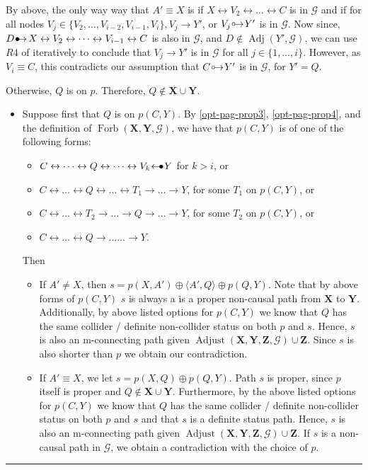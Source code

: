 \documentclass[twoside]{article}
\DeclareMathOperator{\Adj}{Adj}
\DeclareMathOperator{\Forb}{Forb}
\newcommand{\fb}[2][X,Y]{\Forb(\mb{#1},#2)}
\DeclareMathOperator{\Adjust}{Adjust}
\newcommand{\adjustb}[2][X,Y,Z]{\Adjust(\mb{#1},#2)}
\newcommand{\mb}[1]{\mathbf{#1}}
\newcommand{\g}[1][G]{\mathcal{#1}}
\newenvironment{proofof}[1][]{\begin{trivlist}
\item[\hskip \labelsep {\bfseries Proof of #1.}]}{\hfill\BlackBox\end{trivlist}}
\newcommand{\BlackBox}{\rule{1.5ex}{1.5ex}}
\newcommand{\bulletarrow}{
  \setlength{\unitlength}{1mm}
  \begin{picture}(5,1)(0,0)
    \put(0.2,0){$\bullet$}
    \put(1,0){$\rightarrow$}
  \end{picture}
}
\newcommand{\arrowbullet}{
  \setlength{\unitlength}{1mm}
  \begin{picture}(5,1)(0,0)
    \put(0.2,0){$\leftarrow$}
    \put(3,0){$\bullet$}
  \end{picture}
}
\newcommand{\circarrow}{
  \setlength{\unitlength}{1mm}
  \begin{picture}(5,1)(0,0)
    \put(1,1){\circle{1}}
    \put(1.2,0){$\rightarrow$}
  \end{picture}
}
\begin{document}
\begin{proofof}[Lemma \ref{lem:adjust-and-o-pag-helper}]
\begin{itemize}
\begin{itemize}
        By above, the only way way that $A' \equiv X$ is if $X \leftrightarrow V_2 \leftrightarrow \dots \leftrightarrow C$ is in $\g$ and if for all nodes $V_j\in \{V_2, \dots, V_{i-2}, V_{i-1}, V_i\}, V_j \to Y'$, or $V_j \circarrow Y'$ is in $\g$. Now since, $D \bulletarrow X \leftrightarrow V_2 \leftrightarrow \dots \leftrightarrow V_{i-1}  \leftrightarrow C$ is also in $\g$, and $D \notin \Adj(Y', \g)$, we can use $R4$ of \cite{zhang2008completeness} iteratively to conclude that $V_j \to Y'$ is in $\g$ for all $j \in \{1,\dots, i\}$. However, as $V_i \equiv C$, this contradicts our assumption that $C \circarrow Y'$ is in $\g$, for $Y' = Q$.
            
        \end{itemize} 
    \end{itemize}

    Otherwise, $Q$ is on $p$. Therefore, $Q \notin \mb{X} \cup \mb{Y}$. 
    \begin{itemize}
        \item Suppose first that $Q$ is on $p(C,Y)$. By \ref{opt-pag-prop3}, \ref{opt-pag-prop4}, and the definition of $\fb{\g}$, we have that $p(C, Y)$ is of one of the following forms:
        \begin{itemize}
            \item $C \leftrightarrow \dots \leftrightarrow Q \leftrightarrow \dots \leftrightarrow V_k \arrowbullet Y$ for $k > i$, or
            \item $C \leftrightarrow \dots \leftrightarrow Q \leftrightarrow \dots \leftrightarrow T_1 \to \dots \to Y$, for some $T_1$ on $p(C,Y)$, or
            \item $C \leftrightarrow \dots \leftrightarrow T_2 \to \dots \to Q \to \dots \to Y$, for some $T_2$ on $p(C,Y)$, or
             \item $C \leftrightarrow \dots \leftrightarrow Q \to \dots  \dots \to Y$.
        \end{itemize}
        
        Then
        \begin{itemize}
            \item If $A' \neq X$, then $s= p(X,A') \oplus \langle A',Q \rangle \oplus p(Q,Y)$. Note that by above forms of $p(C,Y)$ $s$ is always a is a proper non-causal path from $\mb{X}$ to $\mb{Y}$. Additionally, by above listed options for $p(C,Y)$ we know that $Q$ has the same collider / definite non-collider status on both $p$ and $s$. Hence, $s$ is also an m-connecting path given $\adjustb{\g} \cup \mb{Z}$. Since $s$ is also shorter than $p$ we obtain our contradiction. 
            \item If $A' \equiv X$, we let $s= p(X,Q) \oplus p(Q,Y)$. 
             Path $s$ is proper, since $p$ itself is proper and $Q \notin \mb{X \cup Y}$. Furthermore, by the above listed options for $p(C,Y)$ we know that $Q$ has the same collider / definite non-collider status on both $p$ and $s$ and that $s$ is a definite status path. Hence, $s$ is also an m-connecting path given $\adjustb{\g} \cup \mb{Z}$. If $s$ is a non-causal path in $\g$, we obtain a contradiction with the choice of $p$. 


\end{itemize}
\end{itemize}
\end{proofof}
\end{document}
